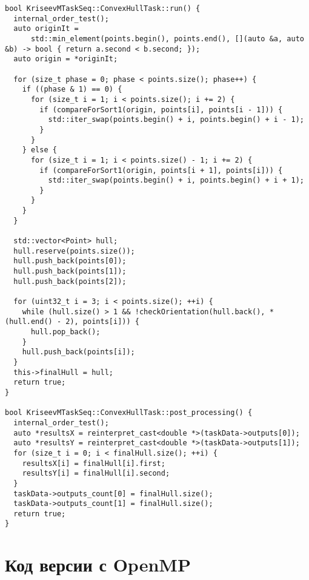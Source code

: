 \documentclass[a4paper]{article}
\begin{document}
\begin{lstlisting}
bool KriseevMTaskSeq::ConvexHullTask::run() {
  internal_order_test();
  auto originIt =
      std::min_element(points.begin(), points.end(), [](auto &a, auto &b) -> bool { return a.second < b.second; });
  auto origin = *originIt;

  for (size_t phase = 0; phase < points.size(); phase++) {
    if ((phase & 1) == 0) {
      for (size_t i = 1; i < points.size(); i += 2) {
        if (compareForSort1(origin, points[i], points[i - 1])) {
          std::iter_swap(points.begin() + i, points.begin() + i - 1);
        }
      }
    } else {
      for (size_t i = 1; i < points.size() - 1; i += 2) {
        if (compareForSort1(origin, points[i + 1], points[i])) {
          std::iter_swap(points.begin() + i, points.begin() + i + 1);
        }
      }
    }
  }

  std::vector<Point> hull;
  hull.reserve(points.size());
  hull.push_back(points[0]);
  hull.push_back(points[1]);
  hull.push_back(points[2]);

  for (uint32_t i = 3; i < points.size(); ++i) {
    while (hull.size() > 1 && !checkOrientation(hull.back(), *(hull.end() - 2), points[i])) {
      hull.pop_back();
    }
    hull.push_back(points[i]);
  }
  this->finalHull = hull;
  return true;
}

bool KriseevMTaskSeq::ConvexHullTask::post_processing() {
  internal_order_test();
  auto *resultsX = reinterpret_cast<double *>(taskData->outputs[0]);
  auto *resultsY = reinterpret_cast<double *>(taskData->outputs[1]);
  for (size_t i = 0; i < finalHull.size(); ++i) {
    resultsX[i] = finalHull[i].first;
    resultsY[i] = finalHull[i].second;
  }
  taskData->outputs_count[0] = finalHull.size();
  taskData->outputs_count[1] = finalHull.size();
  return true;
}
\end{lstlisting}

\section{Код версии с OpenMP}
\end{document}
